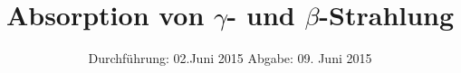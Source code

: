 
\subject{Anfängerpraktikum V704}
\title{Absorption von \texorpdfstring{$\gamma$}{Gamma}- und \texorpdfstring{$\beta$}{Beta}-Strahlung }
\date{
  Durchführung: 02.Juni 2015
  \hspace{3em}
  Abgabe: 09. Juni 2015
}


\maketitle
\thispagestyle{empty}
\newpage





\nocite{skript}
\printbibliography
